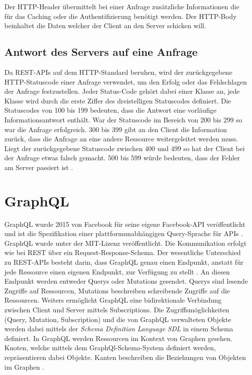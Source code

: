 Der HTTP-Header übermittelt bei einer Anfrage zusätzliche Informationen die für das Caching oder die Authentifizierung benötigt werden.
\newline
Der HTTP-Body beinhaltet die Daten welcher der Client an den Server schicken will.

\subsection{Antwort des Servers auf eine Anfrage}
Da REST-APIs auf dem HTTP-Standard beruhen, wird der zurückgegebene HTTP-Statuscode einer Anfrage verwendet, um den Erfolg oder das Fehlschlagen der Anfrage festzustellen.
Jeder Status-Code gehört dabei einer Klasse an, jede Klasse wird durch die erste Ziffer des dreistelligen Statuscodes definiert.
Die Statuscodes von 100 bis 199 bedeuten, dass die Antwort eine vorläufige Informationsantwort enthält.
War der Statuscode im Bereich von 200 bis 299 so war die Anfrage erfolgreich.
300 bis 399 gibt an den Client die Information zurück, dass die Anfrage an eine andere Ressource weitergeleitet werden muss.
Liegt der zurückgegebene Statuscode zwischen 400 und 499 so hat der Client bei der Anfrage etwas falsch gemacht.
500 bis 599 würde bedeuten, dass der Fehler am Server passiert ist \cite[S. 120]{fielding2000architectural}.

\section{GraphQL}
GraphQL wurde 2015 von Facebook für seine eigene Facebook-API veröffentlicht und ist die Spezifikation einer plattformunabhängigen Query-Sprache für APIs \cite[S. 18]{kress2020graphql}.
GraphQL wurde unter der MIT-Lizenz veröffentlicht.
Die Kommunikation erfolgt wie bei REST über ein Request-Response-Schema.
Der wesentliche Unterschied zu REST-APIs besteht darin, dass GraphQL genau einen Endpunkt, anstatt für jede Ressource einen eigenen Endpunkt, zur Verfügung zu stellt \cite[S. 18]{kress2020graphql}.
An diesen Endpunkt werden entweder Querys oder Mutations gesendet.
Querys sind lesende Zugriffe auf Ressourcen, Mutations beschreiben schreibende Zugriffe auf die Ressourcen.
Weiters ermöglicht GraphQL eine bidirektionale Verbindung zwischen Client und Server mittels Subscriptions.
Die Zugriffsmöglichkeiten (Query, Mutation, Subscription) und die von GraphQL verwalteten Objekte werden dabei mittels der \textit{Schema Definition Language SDL} in einem Schema definiert.
In GraphQL werden Ressourcen im Kontext von Graphen gesehen.
Knoten, welche mittels dem GraphQl-Schema-System definiert werden, repräsentieren dabei Objekte.
Kanten beschreiben die Beziehungen von Objekten im Graphen \cite[Abs. Basics of a GraphQL API]{rakutenGraphQLVsRest}.
\newline

